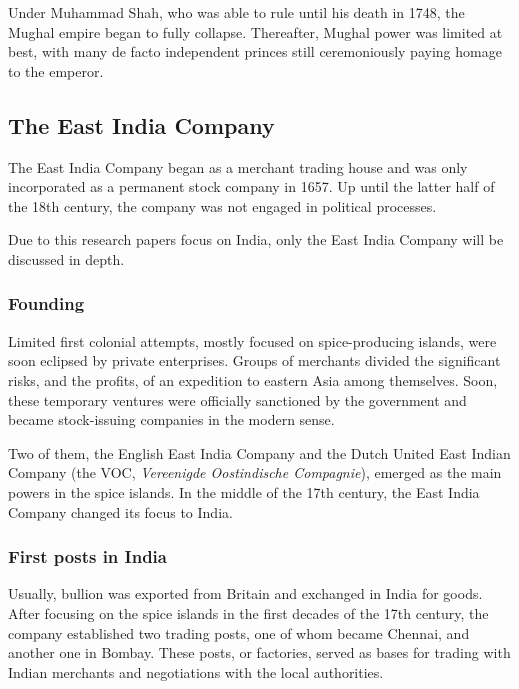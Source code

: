\documentclass[11pt, a4paper, headings=standardclasses]{scrartcl}
\begin{document}
Under Muhammad Shah, who was able to rule until his death in 1748, the Mughal empire began to fully collapse. Thereafter, Mughal power was limited at best, with many de facto independent princes still ceremoniously paying homage to the emperor.\autocite{bose}

\subsection{The East India Company}

The East India Company began as a merchant trading house and was only incorporated as a permanent stock company in 1657.\autocite{EIC2} Up until the latter half of the 18th century, the company was not engaged in political processes.

Due to this research papers focus on India, only the East India Company will be discussed in depth.

\subsubsection{Founding}

Limited first colonial attempts, mostly focused on spice-producing islands, were soon eclipsed by private enterprises. Groups of merchants divided the significant risks, and the profits, of an expedition to eastern Asia among themselves. Soon, these temporary ventures were officially sanctioned by the government and became stock-issuing companies in the modern sense.

Two of them, the English East India Company and the Dutch United East Indian Company (the VOC, \textit{Vereenigde Oostindische Compagnie}), emerged as the main powers in the spice islands.\autocite{VOC} In the middle of the 17th century, the East India Company changed its focus to India.\autocite[Part I]{EIC}

\subsubsection{First posts in India}

Usually, bullion was exported from Britain and exchanged in India for goods.\autocite[Section \textit{The commodity structure of trade}]{FT} After focusing on the spice islands in the first decades of the 17th century, the company established two trading posts, one of whom became Chennai, and another one in Bombay. These posts, or factories, served as bases for trading with Indian merchants and negotiations with the local authorities.\autocite{EIC}
\end{document}
